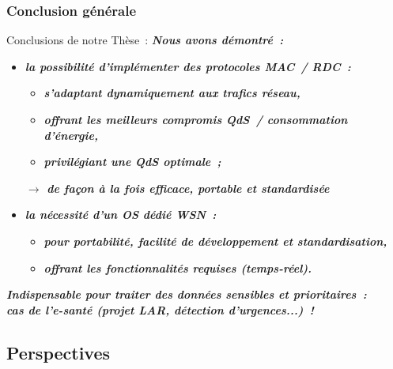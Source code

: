 \documentclass[10pt,c]{beamer}
\renewcommand{\emph}[1]{\textbf{\textit{#1}}}
\begin{document}
\begin{frame}[label=ConclusionsContribs3]
\frametitle{Conclusion générale}

\vspace{-0.25cm}
\begin{alertblock}{Conclusions de notre Thèse~:}
\emph{Nous avons démontré~:}
\begin{itemize}
\item \emph{la possibilité d'implémenter des protocoles MAC~/ RDC~:}
  \begin{itemize}
  \item \emph{s'adaptant dynamiquement aux trafics réseau,}
  \item \emph{offrant les meilleurs compromis QdS~/ consommation d'énergie,}
  \item \emph{privilégiant une QdS optimale~;}
  \end{itemize}
  \emph{$\rightarrow$ de façon à la fois efficace, portable
        et standardisée}
\item \emph{la nécessité d'un OS dédié WSN~:}
  \begin{itemize}
  \item \emph{pour portabilité, facilité de développement et standardisation,}
  \item \emph{offrant les fonctionnalités requises (temps-réel).}
  \end{itemize}
\end{itemize}
\emph{Indispensable pour traiter des données sensibles et prioritaires~: \\
cas de l'e-santé (projet LAR, détection d'urgences...)~!}
\end{alertblock}

\end{frame}


\subsection{Perspectives}
\end{document}
